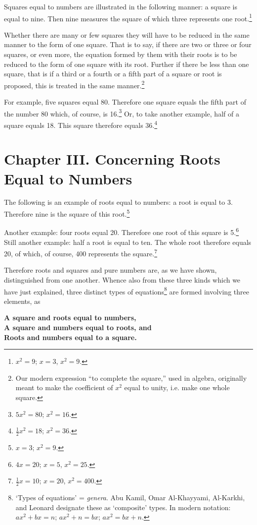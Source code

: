 \documentclass[11pt,a4paper]{book}
\begin{document}
Squares equal to numbers are illustrated in the following manner: a square is equal to nine. Then nine measures the square of which three represents one root.\footnote{$x^2 = 9$; $x = 3$, $x^2 = 9$.}

Whether there are many or few squares they will have to be reduced in the same manner to the form of one square. That is to say, if there are two or three or four squares, or even more, the equation formed by them with their roots is to be reduced to the form of one square with its root. Further if there be less than one square, that is if a third or a fourth or a fifth part of a square or root is proposed, this is treated in the same manner.\footnote{Our modern expression ``to complete the square,'' used in algebra, originally meant to make the coefficient of $x^2$ equal to unity, i.e. make one whole square.}

For example, five squares equal 80. Therefore one square equals the fifth part of the number 80 which, of course, is 16.\footnote{$5x^2 = 80$; $x^2 = 16$.} Or, to take another example, half of a square equals 18. This square therefore equals 36.\footnote{$\frac{1}{2}x^2 = 18$; $x^2 = 36$.}

\section*{Chapter III. Concerning Roots Equal to Numbers}

The following is an example of roots equal to numbers: a root is equal to 3. Therefore nine is the square of this root.\footnote{$x = 3$; $x^2 = 9$.}

Another example: four roots equal 20. Therefore one root of this square is 5.\footnote{$4x = 20$; $x = 5$, $x^2 = 25$.} Still another example: half a root is equal to ten. The whole root therefore equals 20, of which, of course, 400 represents the square.\footnote{$\frac{1}{2}x = 10$; $x = 20$, $x^2 = 400$.}

Therefore roots and squares and pure numbers are, as we have shown, distinguished from one another. Whence also from these three kinds which we have just explained, three distinct types of equations\footnote{`Types of equations' = \textit{genera}. Abu Kamil, Omar Al-Khayyami, Al-Karkhi, and Leonard designate these as `composite' types. In modern notation: $ax^2 + bx = n$; $ax^2 + n = bx$; $ax^2 = bx + n$.} are formed involving three elements, as

\begin{center}
\textbf{A square and roots equal to numbers,}\\
\textbf{A square and numbers equal to roots, and}\\
\textbf{Roots and numbers equal to a square.}
\end{center}
\end{document}
